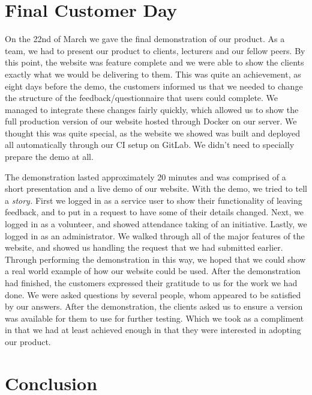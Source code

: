 \documentclass{l3proj}
\begin{document}
\section{Final Customer Day}
\label{sec:finalDay}

On the 22nd of March we gave the final demonstration of our product. As a team, we had to present our product to clients, lecturers and our fellow peers. By this point, the website was feature complete and we were able to show the clients exactly what we would be delivering to them. This was quite an achievement, as eight days before the demo, the customers informed us that we needed to change the structure of the feedback/questionnaire that users could complete. We managed to integrate these changes fairly quickly, which allowed us to show the full production version of our website hosted through Docker on our server. We thought this was quite special, as the website we showed was built and deployed all automatically through our CI setup on GitLab. We didn't need to specially prepare the demo at all.

The demonstration lasted approximately 20 minutes and was comprised of a short presentation and a live demo of our website. With the demo, we tried to tell a \textit{story.} First we logged in as a service user to show their functionality of leaving feedback, and to put in a request to have some of their details changed. Next, we logged in as a volunteer, and showed attendance taking of an initiative. Lastly, we logged in as an administrator. We walked through all of the major features of the website, and showed us handling the request that we had submitted earlier. Through performing the demonstration in this way, we hoped that we could show a real world example of how our website could be used. After the demonstration had finished, the customers expressed their gratitude to us for the work we had done. We were asked questions by several people, whom appeared to be satisfied by our answers. After the demonstration, the clients asked us to ensure a version was available for them to use for further testing. Which we took as a compliment in that we had at least achieved enough in that they were interested in adopting our product.

\section{Conclusion}
\end{document}
